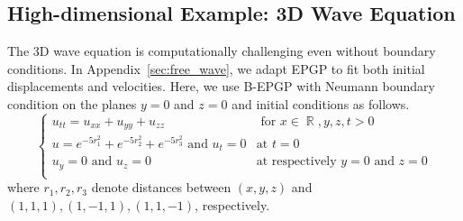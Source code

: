 \documentclass{article} %
\theoremstyle{plain}
\theoremstyle{definition}
\theoremstyle{remark}
\DeclareMathOperator*{\R}{\mathbb{R}}
\begin{document}
\subsection{High-dimensional Example: 3D Wave Equation}\label{subsec:3dwave}
The 3D wave equation is computationally challenging even without boundary conditions. In Appendix~\ref{sec:free_wave}, we adapt EPGP to fit both initial displacements and velocities. %
Here, we use  B-EPGP  with Neumann boundary condition on the planes \(y=0\) and \(z=0\) and initial conditions as follows.
\[
\begin{cases}
    u_{tt}=u_{xx}+u_{yy}+u_{zz} 
    &\text{ for }x\in\R,y,z,t>0\\
        u = e^{-5r_1^2}+e^{-5r_2^2}+e^{-5r_3^2} \text{ and } u_t=0
    &\text{at }t=0\\
     u_y=0\text{ and }u_z=0 &\text{at respectively $y=0$ and $z=0$}\\
\end{cases}
\]
where \(r_1, r_2, r_3\) denote  distances between \((x,y,z)\) and \((1,1,1),(1,-1,1),(1,1,-1)\), respectively.
\end{document}

